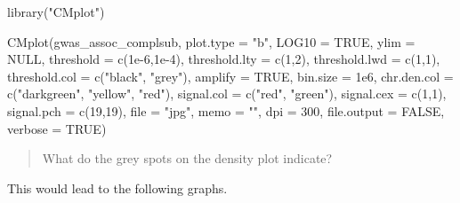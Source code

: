 \documentclass[
]{book}
\newenvironment{Shaded}{\begin{snugshade}}{\end{snugshade}}
\newcommand{\AttributeTok}[1]{\textcolor[rgb]{0.77,0.63,0.00}{#1}}
\newcommand{\ConstantTok}[1]{\textcolor[rgb]{0.00,0.00,0.00}{#1}}
\newcommand{\DecValTok}[1]{\textcolor[rgb]{0.00,0.00,0.81}{#1}}
\newcommand{\FloatTok}[1]{\textcolor[rgb]{0.00,0.00,0.81}{#1}}
\newcommand{\FunctionTok}[1]{\textcolor[rgb]{0.00,0.00,0.00}{#1}}
\newcommand{\NormalTok}[1]{#1}
\newcommand{\StringTok}[1]{\textcolor[rgb]{0.31,0.60,0.02}{#1}}
\begin{document}
\begin{Shaded}
\begin{Highlighting}[]
\FunctionTok{library}\NormalTok{(}\StringTok{"CMplot"}\NormalTok{)}

\FunctionTok{CMplot}\NormalTok{(gwas\_assoc\_complsub,}
       \AttributeTok{plot.type =} \StringTok{"b"}\NormalTok{, }\AttributeTok{LOG10 =} \ConstantTok{TRUE}\NormalTok{, }\AttributeTok{ylim =} \ConstantTok{NULL}\NormalTok{,}
       \AttributeTok{threshold =} \FunctionTok{c}\NormalTok{(}\FloatTok{1e{-}6}\NormalTok{,}\FloatTok{1e{-}4}\NormalTok{), }\AttributeTok{threshold.lty =} \FunctionTok{c}\NormalTok{(}\DecValTok{1}\NormalTok{,}\DecValTok{2}\NormalTok{), }\AttributeTok{threshold.lwd =} \FunctionTok{c}\NormalTok{(}\DecValTok{1}\NormalTok{,}\DecValTok{1}\NormalTok{), }\AttributeTok{threshold.col =} \FunctionTok{c}\NormalTok{(}\StringTok{"black"}\NormalTok{, }\StringTok{"grey"}\NormalTok{),}
       \AttributeTok{amplify =} \ConstantTok{TRUE}\NormalTok{,}
       \AttributeTok{bin.size =} \FloatTok{1e6}\NormalTok{, }\AttributeTok{chr.den.col =} \FunctionTok{c}\NormalTok{(}\StringTok{"darkgreen"}\NormalTok{, }\StringTok{"yellow"}\NormalTok{, }\StringTok{"red"}\NormalTok{),}
       \AttributeTok{signal.col =} \FunctionTok{c}\NormalTok{(}\StringTok{"red"}\NormalTok{, }\StringTok{"green"}\NormalTok{), }\AttributeTok{signal.cex =} \FunctionTok{c}\NormalTok{(}\DecValTok{1}\NormalTok{,}\DecValTok{1}\NormalTok{), }\AttributeTok{signal.pch =} \FunctionTok{c}\NormalTok{(}\DecValTok{19}\NormalTok{,}\DecValTok{19}\NormalTok{),}
       \AttributeTok{file =} \StringTok{"jpg"}\NormalTok{, }\AttributeTok{memo =} \StringTok{""}\NormalTok{, }\AttributeTok{dpi =} \DecValTok{300}\NormalTok{, }\AttributeTok{file.output =} \ConstantTok{FALSE}\NormalTok{, }\AttributeTok{verbose =} \ConstantTok{TRUE}\NormalTok{)}
\end{Highlighting}
\end{Shaded}

\begin{quote}
What do the grey spots on the density plot indicate?
\end{quote}

This would lead to the following graphs.
\end{document}
